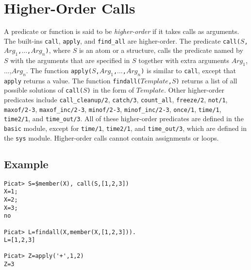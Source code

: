 \section{Higher-Order Calls}
A predicate or function is said to be \emph{higher-order} if it takes calls as arguments. The built-ins \texttt{call}, \texttt{apply}, and \texttt{find\_all} are higher-order. The predicate \texttt{call($S$,$Arg_1$,$\ldots$,$Arg_n$)}, where $S$ is an atom or a structure, calls the predicate named by $S$ with the arguments that are specified in $S$ together with extra arguments $Arg_1$,$\ldots$,$Arg_n$. The function \texttt{apply($S$,$Arg_1$,$\ldots$,$Arg_n$)} is similar to \texttt{call}, except that \texttt{apply} returns a value. The function \texttt{findall($Template$,$S$)} returns a list of all possible solutions of \texttt{call($S$)} in the form of $Template$. Other higher-order predicates include \texttt{call\_cleanup/2}, \texttt{catch/3}, \texttt{count\_all}, \texttt{freeze/2}, \texttt{not/1}, \texttt{maxof/2-3}, \texttt{maxof\_inc/2-3}, \texttt{minof/2-3}, \texttt{minof\_inc/2-3}, \texttt{once/1},  \texttt{time/1}, \texttt{time2/1}, and \texttt{time\_out/3}. All of these higher-order predicates are defined in the {\tt basic} module, except for \texttt{time/1}, \texttt{time2/1}, and \texttt{time\_out/3}, which are defined in the {\tt sys} module. Higher-order calls cannot contain assignments or loops.

\subsection*{Example}
\begin{verbatim}
Picat> S=$member(X), call(S,[1,2,3])
X=1;
X=2;
X=3;
no

Picat> L=findall(X,member(X,[1,2,3])).
L=[1,2,3]

Picat> Z=apply('+',1,2)
Z=3
\end{verbatim}

